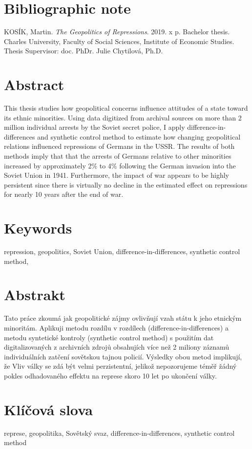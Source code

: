 \pagestyle{empty}

\section*{Bibliographic note}

\noindent KOSÍK, Martin. \textit{The Geopolitics of Repressions}.  2019. x p.
Bachelor thesis. Charles University, Faculty of Social Sciences, Institute of Economic Studies. Thesis Supervisor: doc. PhDr. Julie Chytilová, Ph.D. \\

\section*{Abstract}
  This thesis studies how geopolitical concerns influence attitudes of a state toward its ethnic minorities.
    Using  data digitized from archival sources on  more than 2 million individual arrests by the Soviet secret police, I apply difference-in-differences and synthetic control method to estimate how changing geopolitical relations influenced repressions of Germans in the USSR. 
    The results of both methods imply that that the arrests of Germans relative to other minorities increased by approximately 2\% to 4\% following the German invasion into the Soviet Union in 1941. 
    Furthermore, the impact of war  appears to be highly persistent since there is virtually  no decline in the estimated effect on repressions for nearly 10 years after the end of war.

\section*{Keywords}
repression, geopolitics, Soviet Union, difference-in-differences, synthetic control method, \\
\newpage
\section*{Abstrakt}
Tato práce zkoumá jak geopolitické zájmy ovlivňují vzah státu k jeho etnickým minoritám. 
Aplikuji metodu rozdílu v rozdílech (difference-in-differences) a metodu syntetické kontroly (synthetic control method) s použitím  dat digitalizovaných z archivních zdrojů obsahujích více než 2 miliony záznamů individuálních zatčení sovětskou tajnou policií.  
Výsledky obou metod implikují, že 
Vliv války  se zdá být velmi perzistentní, jelikož nepozorujeme téměř  žádný pokles odhadovaného effektu na represe skoro 10 let po ukončení války. 

\section*{Klíčová slova}
represe, geopolitika, Sovětský svaz, difference-in-differences, synthetic control method\\

\newpage
